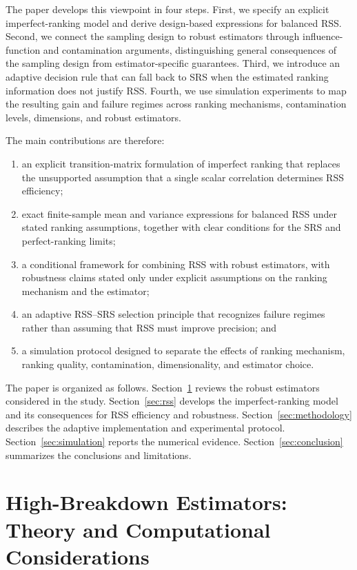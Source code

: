 \documentclass[12pt]{article}
\begin{document}
The paper develops this viewpoint in four steps. First, we specify an explicit imperfect-ranking model and derive design-based expressions for balanced RSS. Second, we connect the sampling design to robust estimators through influence-function and contamination arguments, distinguishing general consequences of the sampling design from estimator-specific guarantees. Third, we introduce an adaptive decision rule that can fall back to SRS when the estimated ranking information does not justify RSS. Fourth, we use simulation experiments to map the resulting gain and failure regimes across ranking mechanisms, contamination levels, dimensions, and robust estimators.

The main contributions are therefore:
\begin{enumerate}
    \item an explicit transition-matrix formulation of imperfect ranking that replaces the unsupported assumption that a single scalar correlation determines RSS efficiency;
    \item exact finite-sample mean and variance expressions for balanced RSS under stated ranking assumptions, together with clear conditions for the SRS and perfect-ranking limits;
    \item a conditional framework for combining RSS with robust estimators, with robustness claims stated only under explicit assumptions on the ranking mechanism and the estimator;
    \item an adaptive RSS--SRS selection principle that recognizes failure regimes rather than assuming that RSS must improve precision; and
    \item a simulation protocol designed to separate the effects of ranking mechanism, ranking quality, contamination, dimensionality, and estimator choice.
\end{enumerate}

The paper is organized as follows. Section~\ref{sec:theoretical} reviews the robust estimators considered in the study. Section~\ref{sec:rss} develops the imperfect-ranking model and its consequences for RSS efficiency and robustness. Section~\ref{sec:methodology} describes the adaptive implementation and experimental protocol. Section~\ref{sec:simulation} reports the numerical evidence. Section~\ref{sec:conclusion} summarizes the conclusions and limitations.

\section{High-Breakdown Estimators: Theory and Computational Considerations}
\label{sec:theoretical}
\end{document}

